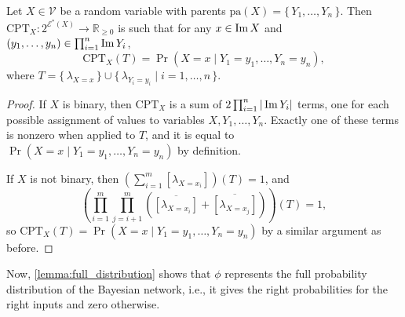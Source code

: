\begin{lemma}\label{lemma:cpt}
  Let $X \in \mathcal{V}$ be a random variable with parents
  $\mathrm{pa}(X) = \{\, Y_1, \dots, Y_n \,\}$. Then
  $\mathrm{CPT}_X\colon 2^{\mathcal{E}^*(X)} \to \mathbb{R}_{\ge 0}$ is such
  that for any $x \in \operatorname{Im} X$ and
  $(y_1, \dots, y_n) \in \prod_{i=1}^n \operatorname{Im} Y_i$,
  \[
    \mathrm{CPT}_X (T) = \Pr(X = x \mid Y_1 = y_1, \dots, Y_n = y_n),
  \]
  where
  $T = \{\, \lambda_{X=x} \,\} \cup \{\, \lambda_{Y_i=y_i} \mid i = 1, \dots, n \,\}$.
\end{lemma}
\begin{proof}
  If $X$ is binary, then $\mathrm{CPT}_X$ is a sum of
  $2\prod_{i=1}^n |\operatorname{Im} Y_i|$ terms, one for each possible assignment of values
  to variables $X, Y_1, \dots, Y_n$. Exactly one of these terms is nonzero when
  applied to $T$, and it is equal to
  $\Pr(X = x \mid Y_1 = y_1, \dots, Y_n = y_n)$ by definition.

  If $X$ is not binary, then
  $\left( \sum_{i=1}^m [\lambda_{X = x_i}] \right)(T) = 1$, and
  \[
    \left( \prod_{i=1}^m \prod_{j=i+1}^m (\overline{[\lambda_{X = x_i}]} + \overline{[\lambda_{X = x_j}]}) \right)(T) = 1,
  \]
  so $\mathrm{CPT}_X(T) = \Pr(X = x \mid Y_1 = y_1, \dots, Y_n = y_n)$ by a
  similar argument as before.
\end{proof}

Now, \cref{lemma:full_distribution} shows that $\phi$ represents the full
probability distribution of the Bayesian network, i.e., it gives the right
probabilities for the right inputs and zero otherwise. 

